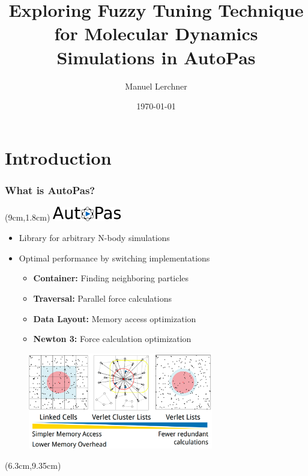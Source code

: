 \documentclass[
	10pt,
	t		%
]{beamer}
\title{Exploring Fuzzy Tuning Technique for Molecular Dynamics Simulations in AutoPas}
\author{Manuel Lerchner}
\date{\today}
\begin{document}
\maketitle

\setcounter{framenumber}{0}

\section{Introduction}
\begin{frame}
	\frametitle{What is AutoPas?}
	
	\begin{textblock*}{5cm}(9cm,1.8cm)
		\includegraphics[width=3cm]{figures/AutoPasLogo}
	\end{textblock*}
	
	\begin{itemize}
		\item Library for arbitrary N-body simulations
		\item Optimal performance by switching implementations
		      \begin{itemize}
			      \item \textbf{Container:} Finding neighboring particles
			      \item \textbf{Traversal:} Parallel force calculations
			      \item \textbf{Data Layout:} Memory access optimization
			      \item \textbf{Newton 3:} Force calculation optimization
		      \end{itemize}
	\end{itemize}
	
	\vspace{-0.1cm}
	\begin{figure}
		\centering
		\includegraphics[width=0.72\textwidth]{figures/traversals.png}
	\end{figure}
	
	\begin{textblock*}{5cm}(6.3cm,9.35cm)
		\tiny{\cite{SIAM_PP24}}
	\end{textblock*}
	
\end{frame}
\end{document}
